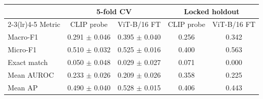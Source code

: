 \begin{tabular}{lcccc}
\toprule
 & \multicolumn{2}{c}{5-fold CV} & \multicolumn{2}{c}{Locked holdout} \\
\cmidrule(lr){2-3}\cmidrule(lr){4-5}
Metric & CLIP probe & ViT-B/16 FT & CLIP probe & ViT-B/16 FT \\
\midrule
Macro-F1 & 0.291 $\pm$ 0.046 & 0.395 $\pm$ 0.040 & 0.256 & 0.342 \\
Micro-F1 & 0.510 $\pm$ 0.032 & 0.525 $\pm$ 0.016 & 0.400 & 0.563 \\
Exact match & 0.050 $\pm$ 0.048 & 0.029 $\pm$ 0.027 & 0.071 & 0.000 \\
Mean AUROC & 0.233 $\pm$ 0.026 & 0.209 $\pm$ 0.026 & 0.358 & 0.225 \\
Mean AP & 0.490 $\pm$ 0.040 & 0.528 $\pm$ 0.015 & 0.406 & 0.443 \\
\bottomrule
\end{tabular}
